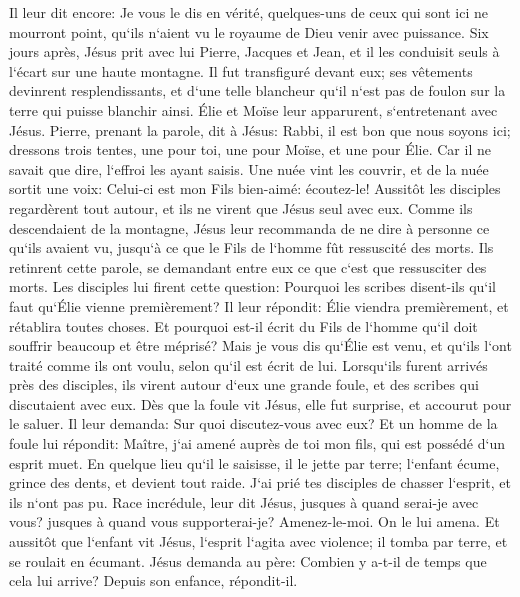 \verse Il leur dit encore: Je vous le dis en vérité, quelques-uns de ceux qui sont ici ne mourront point, qu`ils n`aient vu le royaume de Dieu venir avec puissance. 
\verse Six jours après, Jésus prit avec lui Pierre, Jacques et Jean, et il les conduisit seuls à l`écart sur une haute montagne. Il fut transfiguré devant eux; 
\verse ses vêtements devinrent resplendissants, et d`une telle blancheur qu`il n`est pas de foulon sur la terre qui puisse blanchir ainsi. 
\verse Élie et Moïse leur apparurent, s`entretenant avec Jésus. 
\verse Pierre, prenant la parole, dit à Jésus: Rabbi, il est bon que nous soyons ici; dressons trois tentes, une pour toi, une pour Moïse, et une pour Élie. 
\verse Car il ne savait que dire, l`effroi les ayant saisis. 
\verse Une nuée vint les couvrir, et de la nuée sortit une voix: Celui-ci est mon Fils bien-aimé: écoutez-le! 
\verse Aussitôt les disciples regardèrent tout autour, et ils ne virent que Jésus seul avec eux. 
\verse Comme ils descendaient de la montagne, Jésus leur recommanda de ne dire à personne ce qu`ils avaient vu, jusqu`à ce que le Fils de l`homme fût ressuscité des morts. 
\verse Ils retinrent cette parole, se demandant entre eux ce que c`est que ressusciter des morts. 
\verse Les disciples lui firent cette question: Pourquoi les scribes disent-ils qu`il faut qu`Élie vienne premièrement? 
\verse Il leur répondit: Élie viendra premièrement, et rétablira toutes choses. Et pourquoi est-il écrit du Fils de l`homme qu`il doit souffrir beaucoup et être méprisé? 
\verse Mais je vous dis qu`Élie est venu, et qu`ils l`ont traité comme ils ont voulu, selon qu`il est écrit de lui. 
\verse Lorsqu`ils furent arrivés près des disciples, ils virent autour d`eux une grande foule, et des scribes qui discutaient avec eux. 
\verse Dès que la foule vit Jésus, elle fut surprise, et accourut pour le saluer. 
\verse Il leur demanda: Sur quoi discutez-vous avec eux? 
\verse Et un homme de la foule lui répondit: Maître, j`ai amené auprès de toi mon fils, qui est possédé d`un esprit muet. 
\verse En quelque lieu qu`il le saisisse, il le jette par terre; l`enfant écume, grince des dents, et devient tout raide. J`ai prié tes disciples de chasser l`esprit, et ils n`ont pas pu. 
\verse Race incrédule, leur dit Jésus, jusques à quand serai-je avec vous? jusques à quand vous supporterai-je? Amenez-le-moi. On le lui amena. 
\verse Et aussitôt que l`enfant vit Jésus, l`esprit l`agita avec violence; il tomba par terre, et se roulait en écumant. 
\verse Jésus demanda au père: Combien y a-t-il de temps que cela lui arrive? Depuis son enfance, répondit-il. 
